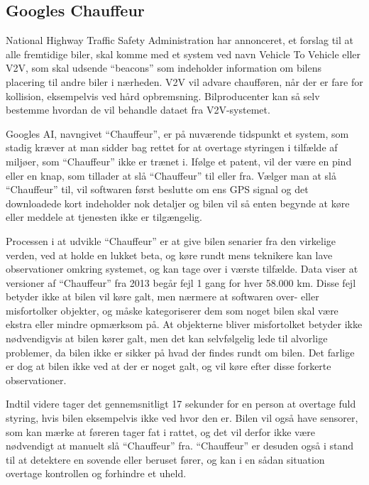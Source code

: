 \subsection{Googles Chauffeur}

National Highway Traffic Safety Administration har annonceret, et forslag til at alle fremtidige biler, skal komme med et system ved navn Vehicle To Vehicle eller V2V, som skal udsende ``beacons'' som indeholder information om bilens placering til andre biler i nærheden. V2V vil advare chaufføren, når der er fare for kollision, eksempelvis ved hård opbremsning. Bilproducenter kan så selv bestemme hvordan de vil behandle dataet fra V2V-systemet.\cite{V2V}

Googles AI, navngivet ``Chauffeur'', er på nuværende tidspunkt et system, som stadig kræver at man sidder bag rettet for at overtage styringen i tilfælde af miljøer, som ``Chauffeur'' ikke er trænet i. Ifølge et patent, vil der være en pind eller en knap, som tillader at slå ``Chauffeur'' til eller fra. Vælger man at slå ``Chauffeur'' til, vil softwaren først beslutte om ens GPS signal og det downloadede kort indeholder nok detaljer og bilen vil så enten begynde at køre eller meddele at tjenesten ikke er tilgængelig.\cite{GooglePatent}

Processen i at udvikle ``Chauffeur'' er at give bilen senarier fra den virkelige verden, ved at holde en lukket beta, og køre rundt mens teknikere kan lave observationer omkring systemet, og kan tage over i værste tilfælde. Data viser at versioner af ``Chauffeur'' fra 2013 begår fejl 1 gang for hver 58.000 km\cite{PopSci}. Disse fejl betyder ikke at bilen vil køre galt, men nærmere at softwaren over- eller misfortolker objekter, og måske kategoriserer dem som noget bilen skal være ekstra eller mindre opmærksom på. At objekterne bliver misfortolket betyder ikke nødvendigvis at bilen kører galt, men det kan selvfølgelig lede til alvorlige problemer, da bilen ikke er sikker på hvad der findes rundt om bilen. Det farlige er dog at bilen ikke ved at der er noget galt, og vil køre efter disse forkerte observationer.

Indtil videre tager det gennemsnitligt 17 sekunder for en person at overtage fuld styring, hvis bilen eksempelvis ikke ved hvor den er. Bilen vil også have sensorer, som kan mærke at føreren tager fat i rattet, og det vil derfor ikke være nødvendigt at manuelt slå ``Chauffeur'' fra. ``Chauffeur'' er desuden også i stand til at detektere en sovende eller beruset fører, og kan i en sådan situation overtage kontrollen og forhindre et uheld.\cite{GooglePatent}


